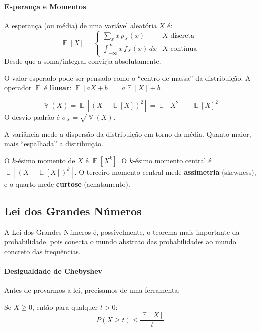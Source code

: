 \documentclass{tufte-handout}
\DeclareMathOperator{\E}{\mathbb{E}}
\DeclareMathOperator{\Var}{\mathbb{V}}
\begin{document}
\paragraph{Esperança e Momentos}

\begin{defn}
    A esperança (ou média) de uma variável aleatória $X$ é:
    \[
    \E[X] = \begin{cases}
        \sum_{x} x\,p_X(x) & X \text{ discreta} \\[4pt]
        \int_{-\infty}^\infty x\,f_X(x)\,dx & X \text{ contínua}
    \end{cases}
    \]
    Desde que a soma/integral convirja absolutamente.
\end{defn}

O valor esperado pode ser pensado como o ``centro de massa'' da distribuição. A operador
$\E$ é \textbf{linear}: $\E[aX+b] = a\E[X] + b$.

\begin{defn}[Variância]
    \[
    \Var(X) = \E[(X - \E[X])^2] = \E[X^2] - \E[X]^2
    \]
    O desvio padrão é $\sigma_X = \sqrt{\Var(X)}$.
\end{defn}

A variância mede a dispersão da distribuição em torno da média. Quanto maior, mais
``espalhada'' a distribuição.

\begin{defn}[Momentos]
    O $k$-ésimo momento de $X$ é $\E[X^k]$.
    O $k$-ésimo momento central é $\E[(X - \E[X])^k]$.
    O terceiro momento central mede \textbf{assimetria} (skewness), e o quarto mede
    \textbf{curtose} (achatamento).
\end{defn}

\subsection{Lei dos Grandes Números}

A Lei dos Grandes Números é, possivelmente, o teorema mais importante da probabilidade,
pois conecta o mundo abstrato das probabilidades ao mundo concreto das frequências.

\paragraph{Desigualdade de Chebyshev}

Antes de provarmos a lei, precisamos de uma ferramenta:

\begin{lem}
    Se $X \ge 0$, então para qualquer $t > 0$:
    \[
    P(X \ge t) \le \frac{\E[X]}{t}
    \]
\end{lem}
\end{document}

